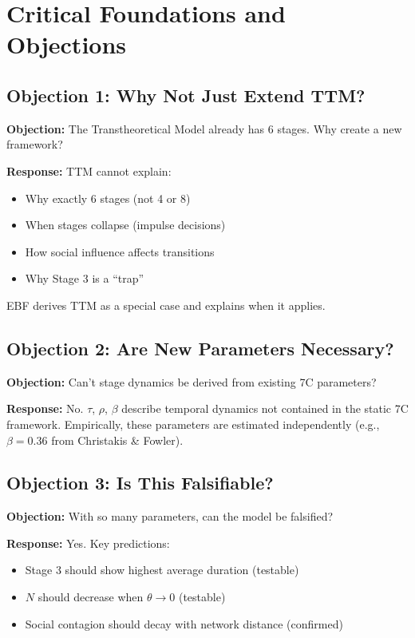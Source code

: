 
\section{Critical Foundations and Objections}
\label{sec:bcj-critical}

\subsection{Objection 1: Why Not Just Extend TTM?}

\textbf{Objection:} The Transtheoretical Model already has 6 stages. Why create a new framework?

\textbf{Response:} TTM cannot explain:
\begin{itemize}[nosep]
\item Why exactly 6 stages (not 4 or 8)
\item When stages collapse (impulse decisions)
\item How social influence affects transitions
\item Why Stage 3 is a ``trap''
\end{itemize}
EBF derives TTM as a special case and explains when it applies.

\subsection{Objection 2: Are New Parameters Necessary?}

\textbf{Objection:} Can't stage dynamics be derived from existing 7C parameters?

\textbf{Response:} No. $\tau$, $\rho$, $\beta$ describe temporal dynamics not contained in the static 7C framework. Empirically, these parameters are estimated independently (e.g., $\beta=0.36$ from Christakis \& Fowler).

\subsection{Objection 3: Is This Falsifiable?}

\textbf{Objection:} With so many parameters, can the model be falsified?

\textbf{Response:} Yes. Key predictions:
\begin{itemize}[nosep]
\item Stage 3 should show highest average duration (testable)
\item $N$ should decrease when $\theta \to 0$ (testable)
\item Social contagion should decay with network distance (confirmed)
\end{itemize}

